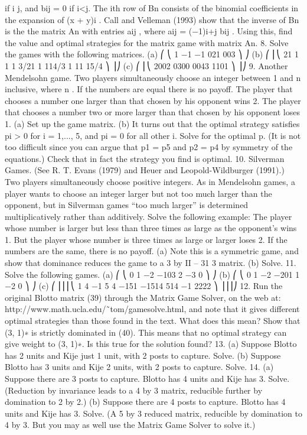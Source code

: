 \documentclass[]{report}
\begin{document}
if i \geq j, and bij = 0 if i<j.
The ith row of Bn consists of the binomial coefficients in the expansion of (x + y)i
. Call
and Velleman (1993) show that the inverse of Bn is the the matrix An with entries aij ,
where aij = (−1)i+j bij . Using this, find the value and optimal strategies for the matrix
game with matrix An.
8. Solve the games with the following matrices.
(a)
⎛
⎝
1 −1 −1
021
003
⎞
⎠ (b)
⎛
⎜⎝
21 1 1
1 3/21 1
114/3 1
11 15/4
⎞
⎟⎠
(c)
⎛
⎜⎝
2002
0300
0043
1101
⎞
⎟⎠
9. Another Mendelsohn game. Two players simultaneously choose an integer
between 1 and n inclusive, where n . If the numbers are equal there is no payoff. The
player that chooses a number one larger than that chosen by his opponent wins 2. The
player that chooses a number two or more larger than that chosen by his opponent loses
1.
(a) Set up the game matrix.
(b) It turns out that the optimal strategy satisfies pi > 0 for i = 1,..., 5, and pi = 0 for all
other i. Solve for the optimal p. (It is not too difficult since you can argue that p1 = p5
and p2 = p4 by symmetry of the equations.) Check that in fact the strategy you find is
optimal.
10. Silverman Games. (See R. T. Evans (1979) and Heuer and Leopold-Wildburger
(1991).) Two players simultaneously choose positive integers. As in Mendelsohn games, a
player wants to choose an integer larger but not too much larger than the opponent, but in
Silverman games “too much larger” is determined multiplicatively rather than additively.
Solve the following example: The player whose number is larger but less than three times
as large as the opponent’s wins 1. But the player whose number is three times as large or
larger loses 2. If the numbers are the same, there is no payoff.
(a) Note this is a symmetric game, and show that dominance reduces the game to a 3 by
II – 31
3 matrix.
(b) Solve.
11. Solve the following games.
(a)
⎛
⎝
0 1 −2
−103
2 −3 0
⎞
⎠ (b)
⎛
⎝
0 1 −2
−201
1 −2 0
⎞
⎠
(c)
⎛
⎜⎜⎜⎝
1 4 −1 5
4 −151
−1514
514 −1
2222
⎞
⎟⎟⎟⎠
12. Run the original Blotto matrix (39) through the Matrix Game Solver, on the
web at: http://www.math.ucla.edu/˜tom/gamesolve.html, and note that it gives different
optimal strategies than those found in the text. What does this mean? Show that (3, 1)∗ is
strictly dominated in (40). This means that no optimal strategy can give weight to (3, 1)∗.
Is this true for the solution found?
13. (a) Suppose Blotto has 2 units and Kije just 1 unit, with 2 posts to capture.
Solve.
(b) Suppose Blotto has 3 units and Kije 2 units, with 2 posts to capture. Solve.
14. (a) Suppose there are 3 posts to capture. Blotto has 4 units and Kije has 3. Solve.
(Reduction by invariance leads to a 4 by 3 matrix, reducible further by domination to 2
by 2.)
(b) Suppose there are 4 posts to capture. Blotto has 4 units and Kije has 3. Solve.
(A 5 by 3 reduced matrix, reducible by domination to 4 by 3. But you may as well use
the Matrix Game Solver to solve it.)
\end{document}
